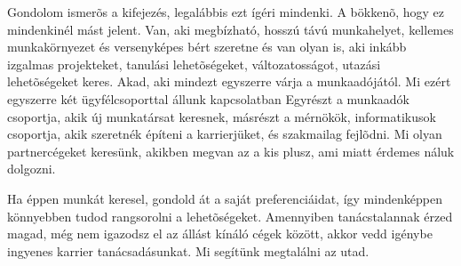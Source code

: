 \documentclass[a4paper]{book}
\begin{document}
Gondolom ismerõs a kifejezés, legalábbis ezt ígéri mindenki. A bökkenõ, hogy ez mindenkinél mást jelent. Van, aki megbízható, hosszú távú munkahelyet, kellemes munkakörnyezet és versenyképes bért szeretne és van olyan is, aki inkább izgalmas projekteket, tanulási lehetõségeket, változatosságot, utazási lehetõségeket keres. Akad, aki mindezt egyszerre várja a munkaadójától. Mi ezért egyszerre két ügyfélcsoporttal állunk kapcsolatban Egyrészt a munkaadók csoportja, akik új munkatársat keresnek, másrészt a mérnökök, informatikusok csoportja, akik szeretnék építeni a karrierjüket, és szakmailag fejlõdni. Mi olyan partnercégeket keresünk, akikben megvan az a kis plusz, ami miatt érdemes náluk dolgozni.

Ha éppen munkát keresel, gondold át a saját preferenciáidat, így mindenképpen könnyebben tudod rangsorolni a lehetõségeket. Amennyiben tanácstalannak érzed magad, még nem igazodsz el az állást kínáló cégek között, akkor vedd igénybe ingyenes karrier tanácsadásunkat. Mi segítünk megtalálni az utad.
\end{document}
